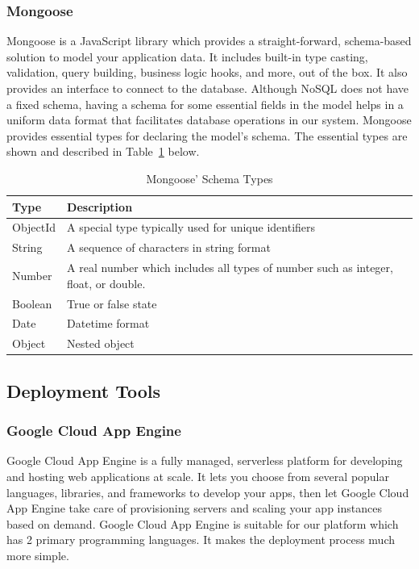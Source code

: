 \documentclass[12pt,oneside,openright,a4paper]{cpe-english-project}
\begin{document}
\subsubsection{Mongoose}

Mongoose is a JavaScript library which provides a straight-forward, schema-based solution to model your application data. It includes built-in type casting, validation, query building, business logic hooks, and more, out of the box. \cite{mongoose} It also provides an interface to connect to the database. Although NoSQL does not have a fixed schema, having a schema for some essential fields in the model helps in a uniform data format that facilitates database operations in our system. Mongoose provides essential types for declaring the model’s schema. The essential types are shown and described in Table~\ref{tbl:2MongooseSchemaTypes} below.

\begin{table}[H]
\caption{Mongoose’ Schema Types}\label{tbl:2MongooseSchemaTypes}
\begin{tabularx}{\textwidth}{l|X} \hline\hline
Type & Description \\ \hline\hline
ObjectId & A special type typically used for unique identifiers \\ \hline
String & A sequence of characters in string format \\ \hline
Number & A real number which includes all types of number such as integer, float, or double. \\ \hline
Boolean & True or false state \\ \hline
Date & Datetime format \\ \hline
Object & Nested object \\ \hline\hline
\end{tabularx}
\end{table}


\subsection{Deployment Tools}

\subsubsection{Google Cloud App Engine}

Google Cloud App Engine is a fully managed, serverless platform for developing and hosting web applications at scale. It lets you choose from several popular languages, libraries, and frameworks to develop your apps, then let Google Cloud App Engine take care of provisioning servers and scaling your app instances based on demand. \cite{GoogleAppEngineDocumentation} Google Cloud App Engine is suitable for our platform which has 2 primary programming languages. It makes the deployment process much more simple.
\end{document}

